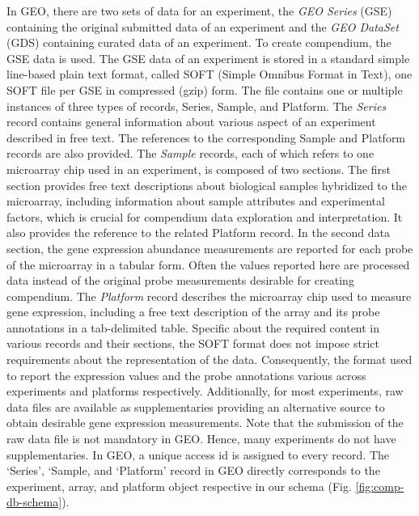 %
In GEO, there are two sets of data for an experiment, the \textit{GEO Series}
(GSE) containing the original submitted data of an experiment and the
\textit{GEO DataSet} (GDS) containing curated data of an experiment.
%
To create compendium, the GSE data is used.
%
The GSE data of an experiment is stored in a standard simple line-based plain
text format, called SOFT (Simple Omnibus Format in Text), one SOFT file per GSE
in compressed (gzip) form.
%
The file contains one or multiple instances of three types of records, Series,
Sample, and Platform.
%
The \textit{Series} record contains general information about various
aspect of an experiment described in free text.  The references to the
corresponding Sample and Platform records are also provided.
%
The \textit{Sample} records, each of which refers to one microarray chip
used in an experiment, is composed of two sections.
%
The first section provides free text descriptions about biological samples
hybridized to the microarray, including information about sample attributes and
experimental factors, which is crucial for compendium data exploration and
interpretation.
%
It also provides the reference to the related Platform record.
%
In the second data section, the gene expression abundance measurements are
reported for each probe of the microarray in a tabular form. Often the values
reported here are processed data instead of the original probe measurements
desirable for creating compendium.
%
The \textit{Platform} record describes the microarray chip used to measure gene
expression, including a free text description of the array and its probe
annotations in a tab-delimited table.
%
Specific about the required content in various records and their sections, the
SOFT format does not impose strict requirements about the representation of the
data.
%
Consequently, the format used to report the expression values and the probe
annotations various across experiments and platforms respectively.
%
Additionally, for most experiments, raw data files are available as
supplementaries providing an alternative source to obtain desirable gene
expression measurements.
%
Note that the submission of the raw data file is not mandatory in GEO.
%
Hence, many experiments do not have supplementaries.
%
In GEO, a unique access id is assigned to every record.
%
The `Series', `Sample, and `Platform' record in GEO directly corresponds
to the experiment, array, and platform object respective in our schema
(Fig. \ref{fig:comp-db-schema}).


